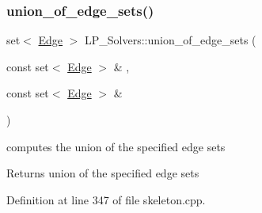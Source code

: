 \subsubsection{\texorpdfstring{union\+\_\+of\+\_\+edge\+\_\+sets()}{union\_of\_edge\_sets()}}
{\footnotesize\ttfamily set$<$ \hyperlink{group___c_l_s_solvers_class_l_p___solvers_1_1_edge}{Edge} $>$ L\+P\+\_\+\+Solvers\+::union\+\_\+of\+\_\+edge\+\_\+sets (\begin{DoxyParamCaption}\item[{const set$<$ \hyperlink{group___c_l_s_solvers_class_l_p___solvers_1_1_edge}{Edge} $>$ \&}]{,  }\item[{const set$<$ \hyperlink{group___c_l_s_solvers_class_l_p___solvers_1_1_edge}{Edge} $>$ \&}]{ }\end{DoxyParamCaption})}



computes the union of the specified edge sets 

\begin{DoxyReturn}{Returns}
union of the specified edge sets 
\end{DoxyReturn}


Definition at line 347 of file skeleton.\+cpp.

